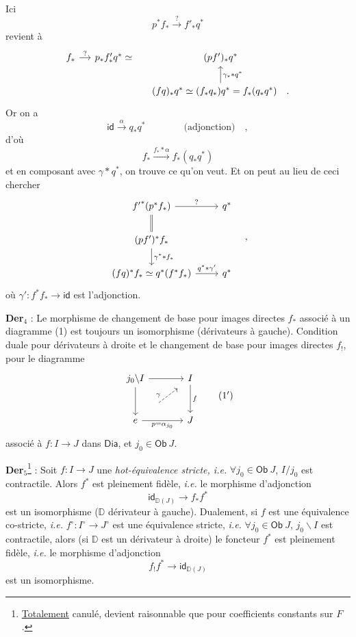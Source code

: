 \documentclass[11pt]{article}
\newcommand{\printedpage}[1]{\marginpar{\footnotesize p.~#1}}
\newcommand{\msp}[1]{\marginpar{\footnotesize [#1]}}
\newcommand{\sDia}{\mathsf{Dia}}
\newcommand{\sOb}{\mathsf{Ob}}
\newcommand{\sid}{\mathsf{id}}
\newcommand{\DD}{\mathbb{D}}
\begin{document}
Ici
\[ p^* f_* \xrightarrow{?} f'_* q^* \]
revient à
\[
\begin{tikzcd}[column sep=small]
f_* \arrow[r, "?"] & p_* f'_* q^* \simeq & (pf')_* q^* \\
 & & (fq)_* q^* \simeq (f_* q_*) q^* = f_*(q_* q^*) \quad . \arrow[u, "\gamma_* * q^*"']
\end{tikzcd}
\]
Or on a
\[ \sid \xrightarrow{\alpha} q_* q^* \qquad\qquad \text{(adjonction)} \quad , \]
d'où
\[ f_* \xrightarrow{f_* * \alpha} f_*(q_* q^*) \]
et en composant avec $\gamma * q^*$, on trouve ce qu'on veut. Et on peut au lieu de ceci chercher
\[
\begin{tikzcd}
{f'}^*(p^* f_*) \arrow[r, "?"] \arrow[d, equal] & q^* \\
(pf')^* f_* \arrow[d, "\gamma^* * f_*"] & \\
(fq)^* f_* \simeq q^*(f^* f_*) \arrow[r, "q^* * \gamma'"] & q^*
\end{tikzcd}
\quad ,
\]
où $\gamma' : f^* f_* \to \sid$ est l'adjonction.

\printedpage{22}
\msp{page 32}
\textbf{Der}$_4$ : Le morphisme de changement de base pour images directes $f_*$ associé à un diagramme (1) est toujours un isomorphisme (dérivateurs à gauche). Condition duale pour dérivateurs à droite et le changement de base pour images directes $f_!$, pour le diagramme
\[
\begin{tikzcd}[row sep=large, column sep=large]
j_0 \backslash I \arrow[r] \arrow[d] & I \arrow[d, "f"] \\
e \arrow[r, "p = \alpha_{j_0}"'] & J
\arrow[from=2-1, to=1-2, dashed, shorten <=22pt, shorten >=8pt, "\gamma"]
\end{tikzcd}
\tag*{(1$'$)}
\]
associé à $f : I \to J$ dans $\sDia$, et $j_0 \in \sOb\ J$.

\textbf{Der}$_5$\footnote[10]{\underline{Totalement} canulé, devient raisonnable que pour coefficients constants sur $F$.} : Soit $f : I \to J$ une \textit{hot-équivalence stricte, i.e.} $\forall j_0 \in \sOb\ J$, $I/j_0$ est contractile. Alors $f^*$ est pleinement fidèle, \textit{i.e.} le morphisme d'adjonction
\[ \sid_{\DD(J)} \longrightarrow f_* f^* \]
est un isomorphisme ($\DD$ dérivateur à gauche). Dualement, si $f$ est une équivalence co-stricte, \textit{i.e.} $f^\circ : I^\circ \to J^\circ$ est une équivalence stricte, \textit{i.e.} $\forall j_0 \in \sOb\ J$, $j_0 \backslash I$ est contractile, alors (si $\DD$ est un dérivateur à droite) le foncteur $f^*$ est pleinement fidèle, \textit{i.e.} le morphisme d'adjonction %
\[ f_! f^* \longrightarrow \sid_{\DD(J)} \]
est un isomorphisme.
\end{document}
